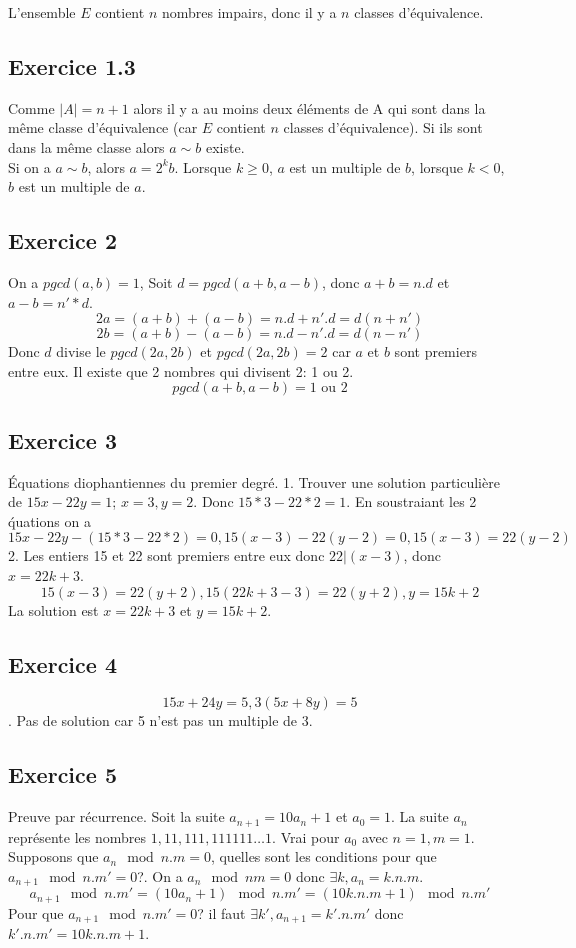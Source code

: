 \documentclass[]{book}
\theoremstyle{definition}
\begin{document}
L'ensemble $E$ contient $n$ nombres impairs, donc il y a $n$ classes d'\'equivalence.

\subsection*{Exercice 1.3}
Comme $|A| = n+1$ alors il y a au moins deux \'el\'ements de A qui sont dans la m\^eme classe d'\'equivalence (car $E$ contient $n$ classes d'\'equivalence). Si ils sont dans la m\^eme classe alors $a \sim b$ existe.\\

Si on a $a \sim b$, alors $a=2^kb$. Lorsque $k\geq 0$, $a$ est un multiple de $b$, lorsque $k<0$, $b$ est un multiple de $a$.

\subsection*{Exercice 2}
On a $pgcd(a,b) = 1$, Soit $d=pgcd(a+b,a-b)$, donc $a+b=n.d$ et $a-b=n'*d$.
$$2a = (a+b)+(a-b) = n.d+n'.d = d(n+n')$$
$$2b = (a+b)-(a-b) = n.d-n'.d = d(n-n')$$
Donc $d$ divise le $pgcd(2a, 2b)$ et $pgcd(2a, 2b)=2$ car $a$ et $b$ sont premiers entre eux. Il existe que 2 nombres qui divisent 2: 1 ou 2.
$$pgcd(a+b,a-b) = 1 \text{ ou } 2$$ 

\subsection*{Exercice 3}
\'Equations diophantiennes du premier degr\'e.
1. Trouver une solution particuli\`ere de $15x - 22y = 1$; $x=3, y=2$. Donc $15*3-22*2 = 1$. En soustraiant les 2 \'quations on a 
$$15x - 22y - (15*3-22*2) = 0, 15(x-3) - 22(y-2) = 0, 15(x-3) = 22(y-2)$$
2. Les entiers 15 et 22 sont premiers entre eux donc $22|(x-3)$, donc $x= 22k+3$.
$$15(x-3) = 22(y+2), 15(22k+3-3) = 22(y+2), y = 15k+2$$
La solution est $x=22k+3$ et $y=15k+2$.

\subsection*{Exercice 4}
$$15x+24y = 5, 3(5x+8y) = 5$$.
Pas de solution car 5 n'est pas un multiple de 3.

\subsection*{Exercice 5}
Preuve par r\'ecurrence. Soit la suite $a_{n+1} = 10a_n+1$ et $a_0 = 1$. La suite $a_n$ repr\'esente les nombres $1, 11, 111, 111111\ldots1$.
Vrai pour $a_0$ avec $n=1, m=1$. Supposons que $a_n \mod n.m = 0$, quelles sont les conditions pour que $a_{n+1} \mod n.m' = 0$?. On a $a_n \mod nm = 0$ donc $\exists k, a_n=k.n.m$.
$$a_{n+1} \mod n.m' = (10a_n + 1) \mod n.m' = (10k.n.m + 1) \mod n.m'$$
Pour que $a_{n+1} \mod n.m' = 0$? il faut $\exists k', a_{n+1}=k'.n.m'$ donc $k'.n.m' = 10k.n.m + 1$.\\
\end{document}
